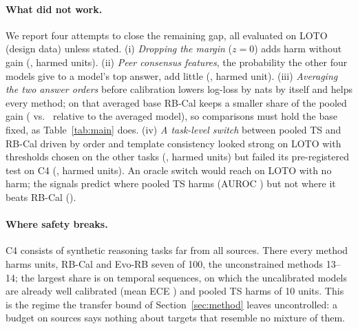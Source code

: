 \documentclass[runningheads]{llncs}
\begin{document}
\paragraph{What did not work.}\label{sec:negative}
We report four attempts to close the remaining gap, all evaluated on LOTO (design data) unless stated.
(i) \emph{Dropping the margin} ($z=0$) adds harm without gain (\LotoRelaxDelta, \LotoRelaxHarm{} harmed units).
(ii) \emph{Peer consensus features}, the probability the other four models give to a model's top answer, add little (\LotoPeerDelta, \LotoPeerHarm{} harmed unit).
(iii) \emph{Averaging the two answer orders} before calibration lowers log-loss by \LotoAvgIdRaw{} nats by itself and helps every method; on that averaged base RB-Cal keeps a smaller share of the pooled gain (\LotoAvgRbSame{} vs.\ \LotoAvgPooledSame{} relative to the averaged model), so comparisons must hold the base fixed, as Table~\ref{tab:main} does.
(iv) \emph{A task-level switch} between pooled TS and RB-Cal driven by order and template consistency looked strong on LOTO with thresholds chosen on the other tasks (\SwitchLotoDelta, \SwitchLotoHarm{} harmed units) but failed its pre-registered test on C4 (\SwitchCfourDelta, \SwitchCfourHarm{} harmed units).
An oracle switch would reach \OracleDelta{} on LOTO with no harm; the signals predict where pooled TS harms (AUROC \AucTemplate) but not where it beats RB-Cal (\AucBeats).

\paragraph{Where safety breaks.}
C4 consists of synthetic reasoning tasks far from all sources.
There every method harms units, RB-Cal and Evo-RB seven of 100, the unconstrained methods 13--14; the largest share is on temporal sequences, on which the uncalibrated models are already well calibrated (mean ECE \CfourTempIdEce) and pooled TS harms \CfourTempPooledHarm{} of 10 units.
This is the regime the transfer bound of Section~\ref{sec:method} leaves uncontrolled: a budget on sources says nothing about targets that resemble no mixture of them.
\end{document}
